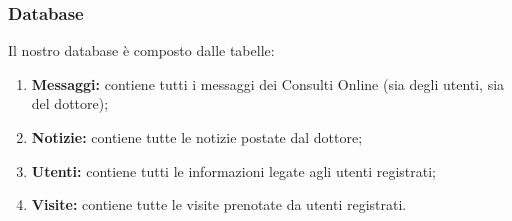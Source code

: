 \subsubsection{Database}
Il nostro database è composto dalle tabelle:
\begin{enumerate}
\item \textbf{Messaggi:} contiene tutti i messaggi dei Consulti Online (sia degli utenti, sia del dottore);
\item \textbf{Notizie:} contiene tutte le notizie postate dal dottore;
\item \textbf{Utenti:} contiene tutti le informazioni legate agli utenti registrati;
\item \textbf{Visite:} contiene tutte le visite prenotate da utenti registrati.
\end{enumerate}
